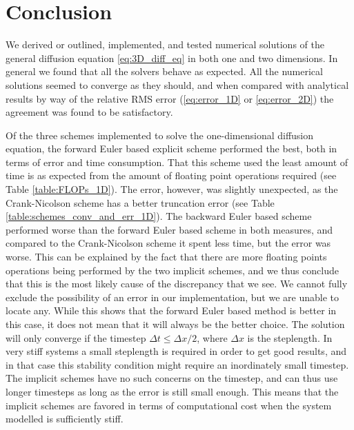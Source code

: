 \documentclass[reprint,english,notitlepage]{revtex4-1}  %
\begin{document}
\clearpage




\section{Conclusion} \label{sec:conclusion}

We derived or outlined, implemented, and tested numerical solutions of the general diffusion equation \eqref{eq:3D_diff_eq} in both one and two dimensions. In general we found that all the solvers behave as expected. All the numerical solutions seemed to converge as they should, and when compared with analytical results by way of the relative RMS error (\eqref{eq:error_1D} or \eqref{eq:error_2D}) the agreement was found to be satisfactory. 

Of the three schemes implemented to solve the one-dimensional diffusion equation, the forward Euler based explicit scheme performed the best, both in terms of error and time consumption. That this scheme used the least amount of time is as expected from the amount of floating point operations required (see Table \ref{table:FLOPs_1D}). The error, however, was slightly unexpected, as the Crank-Nicolson scheme has a better truncation error (see Table \ref{table:schemes_conv_and_err_1D}). The backward Euler based scheme performed worse than the forward Euler based scheme in both measures, and compared to the Crank-Nicolson scheme it spent less time, but the error was worse. This can be explained by the fact that there are more floating points operations being performed by the two implicit schemes, and we thus conclude that this is the most likely cause of the discrepancy that we see. We cannot fully exclude the possibility of an error in our implementation, but we are unable to locate any. While this shows that the forward Euler based method is better in this case, it does not mean that it will always be the better choice. The solution will only converge if the timestep $\Delta t \leq \Delta x/2$, where $\Delta x$ is the steplength. In very stiff systems a small steplength is required in order to get good results, and in that case this stability condition might require an inordinately small timestep. The implicit schemes have no such concerns on the timestep, and can thus use longer timesteps as long as the error is still small enough. This means that the implicit schemes are favored in terms of computational cost when the system modelled is sufficiently stiff. 
\end{document}
